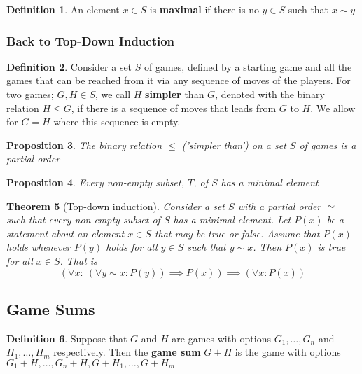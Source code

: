 \documentclass[11pt]{article}
\theoremstyle{plain}
\newtheorem{theorem}{Theorem}[section]
\newtheorem{proposition}[theorem]{Proposition}
\theoremstyle{definition}
\newtheorem{definition}[theorem]{Definition}
\theoremstyle{remark}
\begin{document}
\begin{definition}
    An element \(x \in S\) is \textbf{maximal} if there is no \(y \in S\) such that \(x \sim y\)
\end{definition}

\subsubsection{Back to Top-Down Induction}

\begin{definition}
    Consider a set \(S\) of games, defined by a starting game and all the games that can be reached from it via any sequence of moves of the players. For two games; \(G,H \in S\), we call \(H\) \textbf{simpler} than \(G\), denoted with the binary relation \(H \leq G\), if there is a sequence of moves that leads from \(G\) to \(H\). We allow for \(G = H\) where this sequence is empty.
\end{definition}

\begin{proposition}
    The binary relation \(\leq\) ('simpler than') on a set \(S\) of games is a partial order
\end{proposition}

\begin{proposition}
    Every non-empty subset, \(T\), of \(S\) has a minimal element
\end{proposition}

\begin{theorem}[Top-down induction]
    Consider a set \(S\) with a partial order \(\simeq\) such that every non-empty subset of \(S\) has a minimal element. Let \(P(x)\) be a statement about an element \(x \in S\) that may be true or false. Assume that \(P(x)\) holds whenever \(P(y)\) holds for all \(y \in S\) such that \(y \sim x\). Then \(P(x)\) is true for all \(x \in S\). That is
    \[
        (\forall x :\ ( \forall y \sim x : P(y)) \implies P(x)) \implies (\forall x : P(x))
    \]
\end{theorem}

\subsection{Game Sums}

\begin{definition}
    Suppose that \(G\) and \(H\) are games with options \(G_1, \ldots , G_n\) and \(H_1, \ldots , H_m\) respectively. Then the \textbf{game sum} \(G + H\) is the game with options \(G_1 + H, \ldots , G_n + H, G + H_1, \ldots , G + H_m\)
\end{definition}
\end{document}
